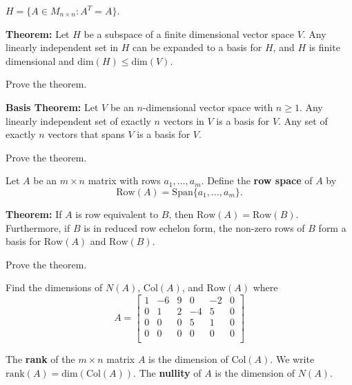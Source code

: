 \documentclass[12pt,letterpaper]{article}
\begin{document}
\begin{enumerate}
\vfill

\Part $H=\{ A \in M_{n \times n} : A^{T}=A \}$.

\vfill

\newpage

{\bf Theorem:} Let $H$ be a subspace of a finite dimensional vector space $V$. Any linearly independent set in $H$ can be expanded to a basis for $H$, and $H$ is finite dimensional and $\text{dim}(H)\leq \text{dim}(V)$.

\Problem Prove the theorem.

\vfill

{\bf Basis Theorem:} Let $V$ be an $n$-dimensional vector space with $n\geq 1$. Any linearly independent set of exactly $n$ vectors in $V$ is a basis for $V$. Any set of exactly $n$ vectors that spans $V$ is a basis for $V$.

\Problem Prove the theorem.

\vfill

\newpage

\begin{defn} Let $A$ be an $m\times n$ matrix with rows $a_1, \dots, a_m$. Define the {\bf row space} of $A$ by $$\text{Row}(A)=\text{Span}\{a_1, \dots, a_m\}.$$
\end{defn}

{\bf Theorem:} If $A$ is row equivalent to $B$, then $\text{Row}(A)=\text{Row}(B)$. Furthermore, if $B$ is in reduced row echelon form, the non-zero rows of $B$ form a basis for $\text{Row}(A)$ and $\text{Row}(B)$.

\Problem Prove the theorem.

\vfill

\Problem Find the dimensions of $N(A)$, $\text{Col}(A)$, and $\text{Row}(A)$ where $$A=\begin{bmatrix}
1 & -6 & 9 &0 &-2 & 0\\
0 & 1 & 2 & -4 & 5 &0\\
0 & 0 &0 & 5 & 1 &0\\
0 & 0 &0 &0 &0 &0\\
\end{bmatrix}$$

\vfill

\begin{defn}
The {\bf rank} of the $m\times n$ matrix $A$ is the dimension of $\text{Col}(A)$. We write $\text{rank}(A)=\text{dim}(\text{Col}(A))$. The {\bf nullity} of $A$ is the dimension of $N(A)$. 
\end{defn}

\newpage


\end{enumerate}
\end{document}
